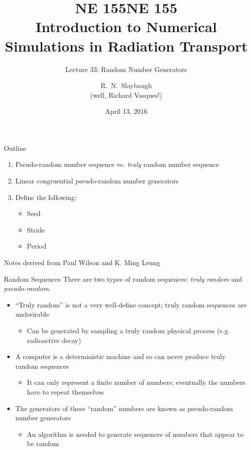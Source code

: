 \documentclass[xcolor=x11names,compress]{beamer}
\title{NE 155}
\author{R.\ N.\ Slaybaugh \\
(well, Richard Vasques!)}
\date{April 13, 2016}
\renewcommand{\(}{\begin{columns}}
\renewcommand{\)}{\end{columns}}
\newcommand{\<}[1]{\begin{column}{#1}}
\renewcommand{\>}{\end{column}}
\begin{document}
\begin{frame}
\title{NE 155\\Introduction to Numerical Simulations in Radiation Transport}
\subtitle{Lecture 33: Random Number Generators}
\titlepage
\end{frame}


\begin{frame}{Outline}

    \begin{enumerate}
    \item Pseudo-random number sequence vs. \textit{truly} random number sequence
    \item Linear congruential pseudo-random number generators
    \item Define the following:
      \begin{itemize}
      \item Seed
      \item Stride
      \item Period
      \end{itemize}
    \end{enumerate}

\vspace*{1em}
Notes derived from Paul Wilson and K. Ming Leung
\end{frame}

\begin{frame}{Random Sequences}
There are two types of random sequences: \textit{truly random} and \textit{pseudo-random}.
\begin{itemize}
\item ``Truly random'' is not a very well-define concept; truly random sequences are undesirable
\begin{itemize}
\item Can be generated by sampling a truly random physical process (e.g. radioactive decay)
\end{itemize}
\item A computer is a deterministic machine and so can never produce truly random sequences
\begin{itemize}
\item It can only represent a finite number of numbers; eventually the numbers have to repeat themselves
\end{itemize}
\item The generators of these ``random'' numbers are known as pseudo-random number generators
\begin{itemize}
\item An algorithm is needed to generate sequences of numbers that appear to be random
\end{itemize}
\end{itemize}

\end{frame}
\end{document}
